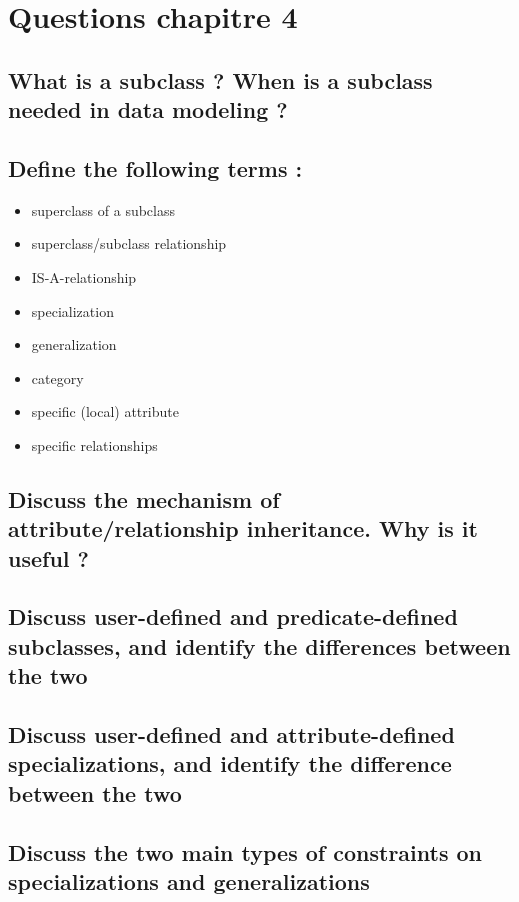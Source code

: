\section{Questions chapitre 4}

\subsection{What is a subclass ? When is a subclass needed in data modeling ?}

\subsection{Define the following terms :}

\begin{itemize}
	\item superclass of a subclass
	\item superclass/subclass relationship
	\item IS-A-relationship
	\item specialization
	\item generalization
	\item category
	\item specific (local) attribute
	\item specific relationships
\end{itemize}

\subsection{Discuss the mechanism of attribute/relationship inheritance. Why is it useful ?}

\subsection{Discuss user-defined and predicate-defined subclasses, and identify the differences between the two}

\subsection{Discuss user-defined and attribute-defined specializations, and identify the difference between the two}

\subsection{Discuss the two main types of constraints on specializations and generalizations}

